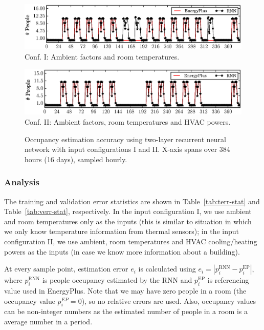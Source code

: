 \begin{figure}[h]

\begin{minipage}{\textwidth}
\centering\includegraphics[width=5in]{figs/results/2LRoomTOnlyDPFAugW3-4}
Conf. I: Ambient factors and room temperatures.
\end{minipage}
\hfill

\vspace{3ex}

\noindent\begin{minipage}{\textwidth}
\centering\includegraphics[width=5in]{figs/results/2LAmbHVACDPFAugW3-4}
Conf. II: Ambient factors, room temperatures and HVAC powers.
\end{minipage}
\hfill
\caption{Occupancy estimation accuracy using two-layer recurrent neural network
    with input configurations I and II. \textcolor{feb18rev}{X-axis spans over
    384 hours (16 days), sampled hourly.}}\label{fig:two-layer}
\end{figure}


\subsubsection{Analysis}
The training and validation error statistics are shown in
Table~\ref{tab:terr-stat} and Table~\ref{tab:verr-stat}, respectively.
In the input configuration I, we use ambient and room temperatures
only as the inputs (this is similar to situation in which we only know
temperature information from thermal sensors); in the input
configuration II, we use ambient, room temperatures and HVAC
cooling/heating powers as the inputs (in case we know more information
about a building).

At every sample point, estimation error $e_i$ is calculated using
$e_i=\left|p_i^{\text{RNN}}-p_i^{\text{EP}}\right|$, where
$p_i^{\text{RNN}}$ is people occupancy estimated by the RNN and
$p_i^{\text{EP}}$ is referencing value used in EnergyPlus. Note that we may
have zero people in a room (the occupancy value $p_i^{EP} = 0$), so
no relative errors are used. Also, occupancy values can be
non-integer numbers as the estimated number of people in a room is a
average number in a period.

